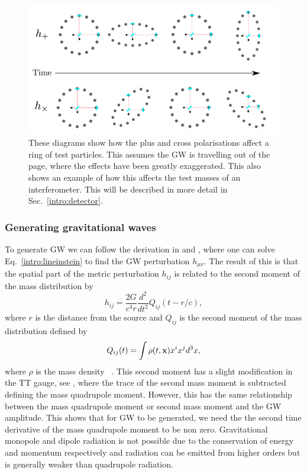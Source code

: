 \begin{figure}[h]
    \centering
    \includegraphics[width=\textwidth]{C1_intro/polarisation_ring.pdf}
 \caption[Plus and Cross polarisations]{These diagrams show how the plus and cross
polarisations affect a ring of test particles. This assumes
the \gls{GW} is travelling out of the page, where the effects
have been greatly exaggerated. This also shows an example of how this
affects the test masses of an interferometer. This will be
described in more detail in Sec.~\ref{intro:detector}.}
\label{gw:polarisations}
\end{figure}



\subsubsection{Generating gravitational waves}

To generate \gls{GW} we can follow the derivation in \citep{flanagan2005BasicsGravitational} and \citep{letiec2016TheoryGravitational}, where one can solve Eq.~\ref{intro:lineinstein} to find the \gls{GW} perturbation $h_{\mu \nu}$.
The result of this is that the spatial part of the metric perturbation $h_{i j}$ is related to the second moment of the mass distribution by
\begin{equation}
    \label{intro:gravwave:amp}
        h_{ij} = \frac{2G}{c^4 r}  \frac{d^2}{dt^2} Q_{ij}(t-r/c),
\end{equation}
where $r$ is the distance from the source \citep{letiec2016TheoryGravitational} and $Q_{i j}$ is the second moment of the mass distribution defined by 
\begin{equation}
    Q_{ij}(t) = \int \rho(t,{\bf x})  x^i x^j d^3x,
\end{equation}
where $\rho$ is the mass density ~\citep{letiec2016TheoryGravitational}.  
This second moment has a slight modification in the TT gauge, see
\citep{flanagan2005BasicsGravitational}, where the trace of the second mass moment is subtracted defining the mass quadrupole moment. 
However, this has the same relationship between the mass quadrupole moment or second mass moment and the \gls{GW} amplitude.  This shows that for \gls{GW} to be generated, we need the the second time derivative of the mass quadrupole moment to be non zero. 
Gravitational monopole and dipole radiation is not possible due to the conservation of energy and momentum respectively \citep{misner1973Gravitation} and radiation can be emitted from higher orders but is generally weaker than quadrupole radiation. 

